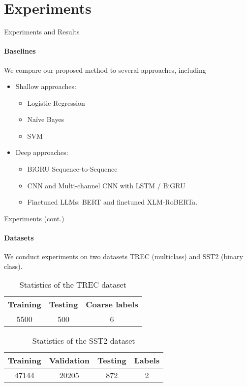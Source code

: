 \section{Experiments}
\begin{frame}{Experiments and Results}
\framesubtitle{Baselines}
We compare our proposed method to several approaches, including
\begin{itemize}
\item Shallow approaches:
\begin{itemize}
\item Logistic Regression
\item Na\"ive Bayes
\item SVM
\end{itemize}
\item Deep approaches:
\begin{itemize}
\item BiGRU Sequence-to-Sequence
\item CNN and Multi-channel CNN with LSTM / BiGRU
\item Finetuned LLMs: BERT and finetuned XLM-RoBERTa.
\end{itemize}
\end{itemize}
\end{frame}

\begin{frame}{Experiments (cont.)}
\framesubtitle{Datasets}

We conduct experiments on two datasets TREC (multiclass) and SST2 (binary class).

\begin{table}
\centering
\begin{tabular}{|c|c|c|}\hline%
\textbf{Training} & \textbf{Testing} & \textbf{Coarse labels} \\ \hline%
5500              & 500              & 6                    \\ \hline %
\end{tabular}
\caption{Statistics of the TREC dataset} \label{tab:trec-insight}
\end{table}

\begin{table}
\centering
\begin{tabular}{|c|c|c|c|} \hline
\textbf{Training} & \textbf{Validation} & \textbf{Testing} & \textbf{Labels} \\ \hline
47144              & 20205              & 872                      & 2 \\ \hline
\end{tabular}
\caption{Statistics of the SST2 dataset} \label{tab:sst2-insight}
\end{table}
\end{frame}

